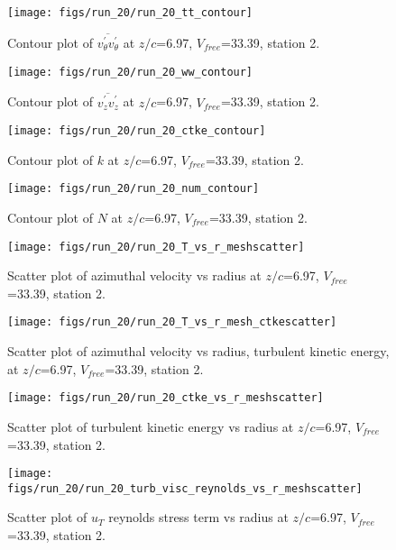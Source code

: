 \begin{figure}[H]
\centering
\texttt{[image: figs/run\_20/run\_20\_tt\_contour]}
\caption{Contour plot of $\overline{v_{\theta}^{\prime} v_{\theta}^{\prime}}$ at $z/c$=6.97, $V_{free}$=33.39, station 2.}
\end{figure}


\begin{figure}[H]
\centering
\texttt{[image: figs/run\_20/run\_20\_ww\_contour]}
\caption{Contour plot of $\overline{v_{z}^{\prime} v_{z}^{\prime}}$ at $z/c$=6.97, $V_{free}$=33.39, station 2.}
\end{figure}


\begin{figure}[H]
\centering
\texttt{[image: figs/run\_20/run\_20\_ctke\_contour]}
\caption{Contour plot of $k$ at $z/c$=6.97, $V_{free}$=33.39, station 2.}
\end{figure}


\begin{figure}[H]
\centering
\texttt{[image: figs/run\_20/run\_20\_num\_contour]}
\caption{Contour plot of $N$ at $z/c$=6.97, $V_{free}$=33.39, station 2.}
\end{figure}


\begin{figure}[H]
\centering
\texttt{[image: figs/run\_20/run\_20\_T\_vs\_r\_meshscatter]}
\caption{Scatter plot of azimuthal velocity vs radius at $z/c$=6.97, $V_{free}$=33.39, station 2.}
\end{figure}


\begin{figure}[H]
\centering
\texttt{[image: figs/run\_20/run\_20\_T\_vs\_r\_mesh\_ctkescatter]}
\caption{Scatter plot of azimuthal velocity vs radius, turbulent kinetic energy, at $z/c$=6.97, $V_{free}$=33.39, station 2.}
\end{figure}


\begin{figure}[H]
\centering
\texttt{[image: figs/run\_20/run\_20\_ctke\_vs\_r\_meshscatter]}
\caption{Scatter plot of turbulent kinetic energy vs radius at $z/c$=6.97, $V_{free}$=33.39, station 2.}
\end{figure}


\begin{figure}[H]
\centering
\texttt{[image: figs/run\_20/run\_20\_turb\_visc\_reynolds\_vs\_r\_meshscatter]}
\caption{Scatter plot of $
u_T$ reynolds stress term vs radius at $z/c$=6.97, $V_{free}$=33.39, station 2.}
\end{figure}



